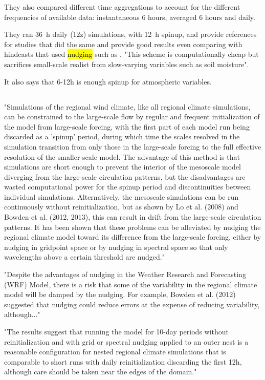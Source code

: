 \documentclass[12pt,a4paper]{article}
\begin{document}
They also compared different time aggregations to account for the different frequencies of available data: instantaneous 6 hours, averaged 6 hours and daily.

They ran 36~h daily (12z) simulations, with 12~h spinup, and provide references for studies that did the same and provide good results even comparing with hindcasts that used \hl{nudging} such as \cite{Menendez2014}. "This scheme is computationally cheap but sacrifices small-scale realist from slow-varying variables such as soil moisture".  

It also says that 6-12h is enough spinup for atmospheric variables.

\subsection{\cite{Vincent2015}}

"Simulations of the regional wind climate, like all regional climate simulations, can be constrained to the large-scale flow by regular and frequent initialization of the model from large-scale forcing, with the first part of each model run being discarded as a 'spinup’ period, during which time the scales resolved in the simulation transition from only those in the large-scale forcing to the full effective resolution of the smaller-scale model. The advantage of this method is that simulations are short enough to prevent the interior of the mesoscale model diverging from the large-scale circulation patterns, but the disadvantages are wasted computational power for the spinup period and discontinuities between individual simulations. Alternatively, the mesoscale simulations can be run continuously without reinitialization, but as shown by Lo et al. (2008) and Bowden et al. (2012, 2013), this can result in drift from the large-scale circulation patterns. It has been shown that these problems can be alleviated by nudging the regional climate model toward its difference from the large-scale forcing, either by nudging in gridpoint space or by nudging in spectral space so that only wavelengths above a certain threshold are nudged."

"Despite the advantages of nudging in the Weather Research and Forecasting (WRF) Model, there is a risk that some of the variability in the regional climate model will be damped by the nudging. For example, Bowden et al. (2012) suggested that nudging could reduce errors at the expense of reducing variability, although..."

"The results suggest that running the model for 10-day periods without reinitialization and with grid or spectral nudging applied to an outer nest is a reasonable configuration for nested regional climate simulations that is comparable to short runs with daily reinitialization discarding the first 12h, although care should be taken near the edges of the domain."
\end{document}
